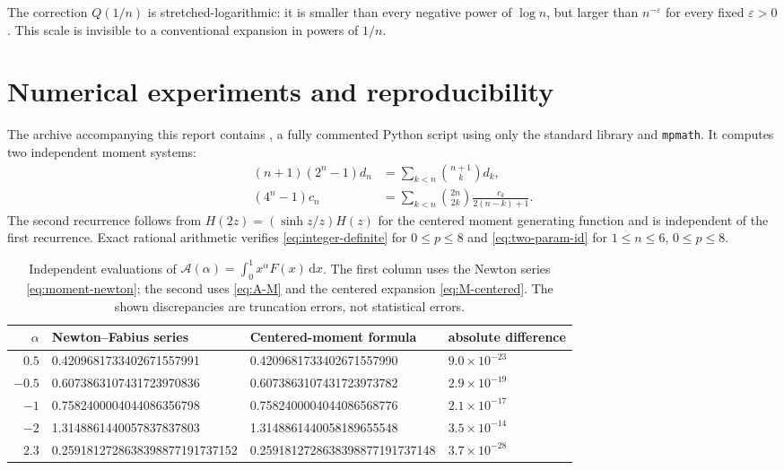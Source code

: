 \documentclass[11pt,oneside]{article}
\theoremstyle{definition}
\theoremstyle{remark}
\newcommand{\dd}{\,\mathrm d}
\newcommand{\eps}{\varepsilon}
\newcommand{\1}{\mathbf 1}
\begin{document}
The correction \(Q(1/n)\) is stretched-logarithmic: it is smaller than every
negative power of \(\log n\), but larger than \(n^{-\eps}\) for every fixed
\(\eps>0\).  This scale is invisible to a conventional expansion in powers of
\(1/n\).

\section{Numerical experiments and reproducibility}

The archive accompanying this report contains
, a fully commented Python script using only
the standard library and \texttt{mpmath}.  It computes two independent moment
systems:
\begin{align}
 (n+1)(2^n-1)d_n&=\sum_{k<n}\binom{n+1}{k}d_k,                 \label{eq:num-d}\\
 (4^n-1)c_n&=\sum_{k<n}\binom{2n}{2k}\frac{c_k}{2(n-k)+1}.     \label{eq:num-c}
\end{align}
The second recurrence follows from
\(H(2z)=(\sinh z/z)H(z)\) for the centered moment generating function and is
independent of the first recurrence.  Exact rational arithmetic verifies
\eqref{eq:integer-definite} for \(0\leq p\leq8\) and
\eqref{eq:two-param-id} for \(1\leq n\leq6\), \(0\leq p\leq8\).

\begin{table}[htbp]
\centering
\small
\caption{Independent evaluations of
\(\mathcal A(\alpha)=\int_0^1x^\alpha F(x)\dd x\).  The first column uses the
Newton series \eqref{eq:moment-newton}; the second uses
\eqref{eq:A-M} and the centered expansion \eqref{eq:M-centered}.  The shown
discrepancies are truncation errors, not statistical errors.}
\label{tab:fractional-checks}
\begin{tabular}{@{}rlll@{}}
\toprule
\(\alpha\)&Newton--Fabius series&Centered-moment formula&absolute difference\\
\midrule
\(0.5\)&0.4209681733402671557991&0.4209681733402671557990&\(9.0\times10^{-23}\)\\
\(-0.5\)&0.6073863107431723970836&0.6073863107431723973782&\(2.9\times10^{-19}\)\\
\(-1\)&0.7582400004044086356798&0.7582400004044086568776&\(2.1\times10^{-17}\)\\
\(-2\)&1.3148861440057837837803&1.3148861440058189655548&\(3.5\times10^{-14}\)\\
\(2.3\)&0.2591812728638398877191737152&0.2591812728638398877191737148&\(3.7\times10^{-28}\)\\
\bottomrule
\end{tabular}
\end{table}
\end{document}
